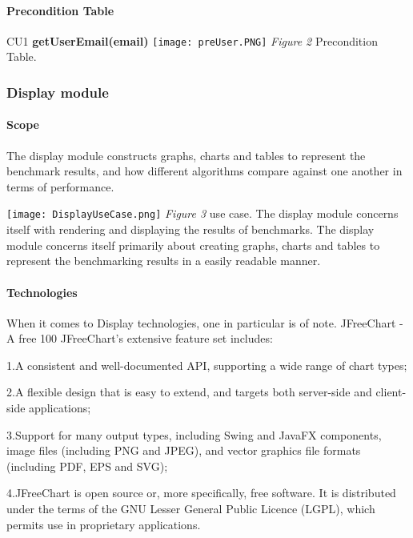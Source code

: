 \documentclass[runningheads,a4paper]{article}
\begin{document}
        \paragraph{\textbf{Precondition Table}}
        CU1 \textbf{getUserEmail(email)}
        \newline
        \newline
        \texttt{[image: preUser.PNG]}
        \newline 
        \textit{Figure 2} Precondition Table.

    
    
    \subsubsection{Display module}
        \paragraph{Scope}
        The display module constructs graphs, charts and tables to represent the benchmark results, and how different algorithms 
        compare against one another in terms of performance.
        
        \texttt{[image: DisplayUseCase.png]}
        \newline 
        \textit{Figure 3} use case.
        \newline
        \newline
        The display module concerns itself with rendering and displaying the results of benchmarks.
        The display module concerns itself primarily about creating graphs, charts and tables to represent the
        benchmarking results in a easily readable manner. 
        \newline
       
        \paragraph{\textbf{Technologies}}
        \newline
        When it comes to Display technologies, one in particular is of note.
         JFreeChart - A free 100%
         JFreeChart's extensive feature set includes:
        	\item 1.A consistent and well-documented API, supporting a wide range of chart types;
        	\item 2.A flexible design that is easy to extend, and targets both server-side and client-side applications;
        	\item 3.Support for many output types, including Swing and JavaFX components, image files (including PNG and JPEG), and vector graphics file formats (including PDF, EPS and SVG);
        	\item 4.JFreeChart is open source or, more specifically, free software. It is distributed under the terms of the GNU Lesser General Public Licence (LGPL), which permits use in proprietary applications.\\
        	
\end{document}
